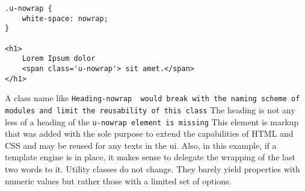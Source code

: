 \pagebreak
{}
\begin{lstlisting}
.u-nowrap {
    white-space: nowrap;
}

<h1>
    Lorem Ipsum dolor
    <span class='u-nowrap'> sit amet.</span>
</h1>
\end{lstlisting}
A class name like \verb .Heading-nowrap  would break with the naming scheme of modules and limit the reusability of this class.
The heading is not any less of a heading of the \verb .u-nowrap element is missing.
This element is markup that was added with the sole purpose to extend the capabilities of HTML and CSS and may be reused for any texts in the \gls{ui}.
Also, in this example, if a template engine is in place, it makes sense to delegate the wrapping of the last two words to it.
Utility classes do not change.
They barely yield properties with numeric values but rather those with a limited set of options.

